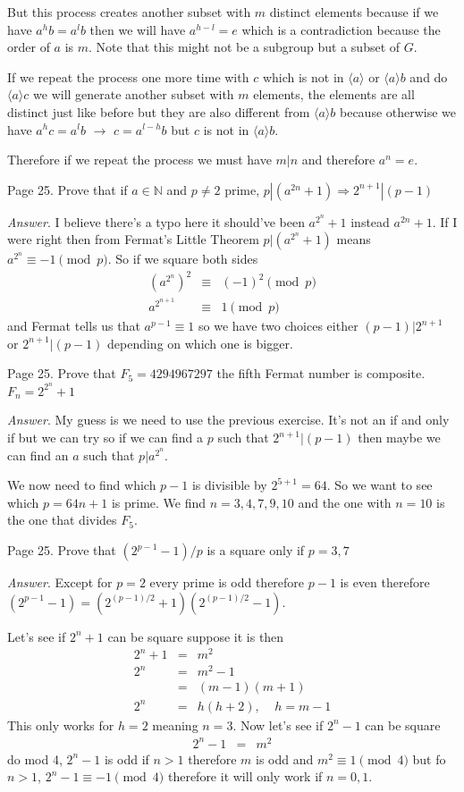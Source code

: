 \documentclass[aps,preprint,preprintnumbers,nofootinbib,showpacs,prd]{revtex4-1}
\newcommand{\nbea}{\begin{eqnarray*}}
\newcommand{\neea}{\end{eqnarray*}}
\begin{document}
But this process creates another subset with $m$ distinct elements because if we have $a^h b = a^l b$ then we will have $a^{h - l} = e$ which is a contradiction because the order of $a$ is $m$. Note that this might not be a subgroup but a subset of $G$.

If we repeat the process one more time with $c$ which is not in $\langle a \rangle$ or $\langle a \rangle b$ and do $\langle a \rangle c$ we will generate another subset with $m$ elements, the elements are all distinct just like before but they are also different from $\langle a \rangle b$ because otherwise we have $a^h c = a^l b$ $\to$ $c = a^{l-h} b$ but $c$ is not in $\langle a \rangle b$.

Therefore if we repeat the process we must have $m|n$ and therefore $a^n = e$.





Page 25. Prove that if $a \in \mathbb{N}$ and $p\neq2$ prime, $p|(a^{2n} + 1) \Rightarrow 2^{n+1}|(p - 1)$

{\it Answer}. I believe there's a typo here it should've been $a^{2^n} + 1$ instead $a^{2n} + 1$. If I were right then from Fermat's Little Theorem $p|(a^{2^n} + 1)$ means $a^{2^n} \equiv -1 \pmod{p}$. So if we square both sides 
%
\nbea
(a^{2^n})^2 & \equiv & (-1)^2 \pmod{p} \\
a^{2^{n+1}} & \equiv & 1 \pmod{p}
\neea
%
and Fermat tells us that $a^{p-1} \equiv 1$ so we have two choices either $(p-1)|2^{n+1}$ or $2^{n+1}|(p - 1)$ depending on which one is bigger.

Page 25. Prove that $F_5 = 4294967297$ the fifth Fermat number is composite. $F_n = 2^{2^n} + 1$

{\it Answer}. My guess is we need to use the previous exercise. It's not an if and only if but we can try so if we can find a $p$ such that $2^{n+1}|(p-1)$ then maybe we can find an $a$ such that $p|a^{2^n}$.

We now need to find which $p - 1$ is divisible by $2^{5 + 1} = 64$. So we want to see which $p = 64n + 1$ is prime. We find $n = 3, 4, 7, 9, 10$ and the one with $n = 10$ is the one that divides $F_5$.

Page 25. Prove that $(2^{p-1} - 1)/p$ is a square only if $p = 3, 7$

{\it Answer}. Except for $p = 2$ every prime is odd therefore $p - 1$ is even therefore $(2^{p-1} - 1) = (2^{(p-1)/2} + 1)(2^{(p-1)/2} - 1)$.

Let's see if $2^n + 1$ can be square suppose it is then 
%
\nbea
2^n + 1 & = & m^2 \\
2^n & = & m^2 - 1 \\
& = & (m - 1)(m + 1) \\
2^n & = & h(h + 2), ~~~~~ h = m - 1
\neea
%
This only works for $h = 2$ meaning $n = 3$. Now let's see if $2^n - 1$ can be square 
%
\nbea
2^n - 1 & = & m^2
\neea
%
do mod 4, $2^n - 1$ is odd if $n > 1$ therefore $m$ is odd and $m^2 \equiv 1 \pmod{4}$ but fo $n > 1$, $2^n - 1 \equiv -1 \pmod{4}$ therefore it will only work if $n = 0, 1$.
\end{document}
